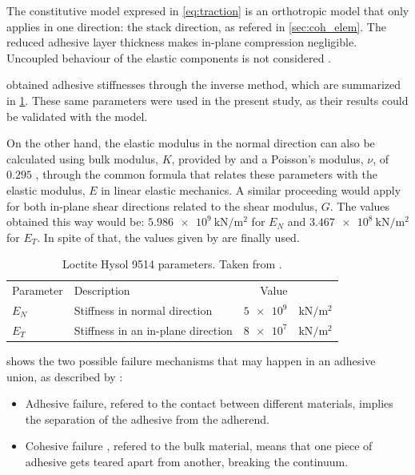 \documentclass[cmfonts]{witpress}
\begin{document}
The constitutive model expresed in \cref{eq:traction} is an orthotropic model that only applies in one direction: the stack direction, as refered in \cref{sec:coh_elem}. The reduced adhesive layer thickness makes in-plane compression negligible. Uncoupled behaviour of the elastic components is not considered \cite{Scattina2011}.

\cite{Scattina2011} obtained adhesive stiffnesses through the inverse method, which are summarized in \cref{tab:ads_params}. These same parameters were used in the present study, as their results could be validated with the model.

On the other hand, the elastic modulus in the normal direction can also be calculated using bulk modulus, $K$, provided by \cite{manufCatalog} and a Poisson's modulus, $\nu$, of $\num{0.295}$ \cite{JDiaz}, through the common formula that relates these parameters with the elastic modulus, $E$ in linear elastic mechanics. A similar proceeding would apply for both in-plane shear directions related to the shear modulus, $G$. The values obtained this way would be: $\SI{5.986e9}{\kN/\m^2}$ for $E_{N}$ and $\SI{3.467e8}{\kN/\m^2}$ for $E_{T}$. In spite of that, the values given by \cite{Scattina2011} are finally used.

\begin{table}
	\centering
	\begin{tabular}{llrl}
		Parameter & Description & Value & \\
		
		$E_{N}$ & Stiffness in normal direction & $\num{5e9}$ & $\si{\kN/\m^2}$ \\
		$E_{T}$ & Stiffness in an in-plane direction & $\num{8e7}$ & $\si{\kN/\m^2}$ \\
	\end{tabular}
	\caption[Loctite Hysol 9514 parameters.]{Loctite Hysol 9514 parameters. Taken from \cite{Scattina2011}.}
	\label{tab:ads_params}
\end{table}


 shows the two possible failure mechanisms that may happen in an adhesive union, as described by \cite{Wu2013}:
\begin{itemize}
	\item Adhesive failure, refered to the contact between different materials, implies the separation of the adhesive from the adherend.

	\item Cohesive failure \cite{Vaidya2006}, refered to the bulk material, means that one piece of adhesive gets teared apart from another, breaking the continuum.
\end{itemize}
\end{document}
